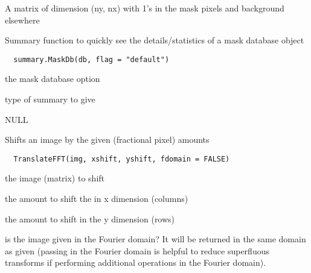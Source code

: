 \documentclass[a4paper]{book}
\begin{document}
%
\begin{Value}
A matrix of dimension (ny, nx) with 1's in the mask
pixels and background elsewhere
\end{Value}
%
\begin{Description}\relax
Summary function to quickly see the details/statistics of
a mask database object
\end{Description}
%
\begin{Usage}
\begin{verbatim}
  summary.MaskDb(db, flag = "default")
\end{verbatim}
\end{Usage}
%
\begin{Arguments}
\begin{ldescription}
\item[\code{db}] the mask database option

\item[\code{flag}] type of summary to give
\end{ldescription}
\end{Arguments}
%
\begin{Value}
NULL
\end{Value}
%
\begin{Description}\relax
Shifts an image by the given (fractional pixel) amounts
\end{Description}
%
\begin{Usage}
\begin{verbatim}
  TranslateFFT(img, xshift, yshift, fdomain = FALSE)
\end{verbatim}
\end{Usage}
%
\begin{Arguments}
\begin{ldescription}
\item[\code{img}] the image (matrix) to shift

\item[\code{xshift}] the amount to shift the in x dimension
(columns)

\item[\code{yshift}] the amount to shift in the y dimension
(rows)

\item[\code{fdomain}] is the image given in the Fourier domain?
It will be returned in the same domain as given (passing
in the Fourier domain is helpful to reduce superfluous
transforms if performing additional operations in the
Fourier domain).
\end{ldescription}
\end{Arguments}
\end{document}
